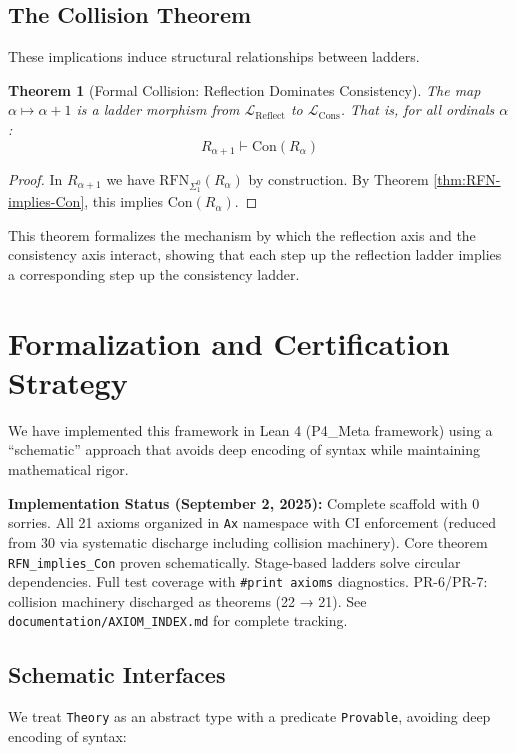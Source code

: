 \documentclass[11pt]{article}
\newtheorem{theorem}{Theorem}[section]
\newcommand{\Con}{\mathrm{Con}}
\newcommand{\RFNSigOne}{\mathrm{RFN}_{\Sigma^0_1}}
\newcommand{\LCons}{\mathcal{L}_{\mathrm{Cons}}}
\newcommand{\LReflect}{\mathcal{L}_{\mathrm{Reflect}}}
\begin{document}
\subsection{The Collision Theorem}
These implications induce structural relationships between ladders.

\begin{theorem}[Formal Collision: Reflection Dominates Consistency]
The map $\alpha \mapsto \alpha+1$ is a ladder morphism from $\LReflect$ to $\LCons$. That is, for all ordinals $\alpha$:
$$R_{\alpha+1} \vdash \Con(R_\alpha)$$
\end{theorem}
\begin{proof}
In $R_{\alpha+1}$ we have $\RFNSigOne(R_\alpha)$ by construction. By Theorem \ref{thm:RFN-implies-Con}, this implies $\Con(R_\alpha)$.
\end{proof}

This theorem formalizes the mechanism by which the reflection axis and the consistency axis interact, showing that each step up the reflection ladder implies a corresponding step up the consistency ladder.

\section{Formalization and Certification Strategy}
We have implemented this framework in Lean 4 (P4\_Meta framework) using a ``schematic'' approach that avoids deep encoding of syntax while maintaining mathematical rigor.

\begin{mdframed}[style=provenance]
\textbf{Implementation Status (September 2, 2025):} Complete scaffold with 0 sorries. All 21 axioms organized in \texttt{Ax} namespace with CI enforcement (reduced from 30 via systematic discharge including collision machinery). Core theorem \texttt{RFN\_implies\_Con} proven schematically. Stage-based ladders solve circular dependencies. Full test coverage with \texttt{\#print axioms} diagnostics. PR-6/PR-7: collision machinery discharged as theorems (22 → 21). See \texttt{documentation/AXIOM\_INDEX.md} for complete tracking.
\end{mdframed}

\subsection{Schematic Interfaces}
We treat \texttt{Theory} as an abstract type with a predicate \texttt{Provable}, avoiding deep encoding of syntax:
\end{document}
